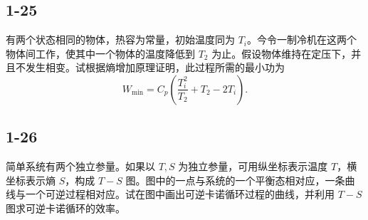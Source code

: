 \newpage
\subsection{1-25}
有两个状态相同的物体，热容为常量，初始温度同为 $T_i$。今令一制冷机在这两个物体间工作，使其中一个物体的温度降低到 $T_2$ 为止。假设物体维持在定压下，并且不发生相变。试根据熵增加原理证明，此过程所需的最小功为
$$W_{\text{min}} = C_p \left( \frac{T_i^2}{T_2} + T_2 - 2T_i \right).$$

\newpage
\subsection{1-26}
简单系统有两个独立参量。如果以 $T, S$ 为独立参量，可用纵坐标表示温度 $T$，横坐标表示熵 $S$，构成 $T-S$ 图。图中的一点与系统的一个平衡态相对应，一条曲线与一个可逆过程相对应。试在图中画出可逆卡诺循环过程的曲线，并利用 $T-S$ 图求可逆卡诺循环的效率。
